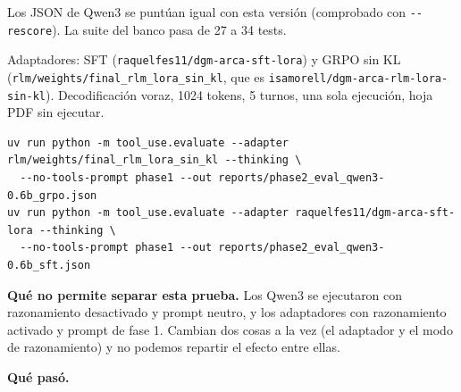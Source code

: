 Los JSON de Qwen3 se puntúan igual con esta versión (comprobado con \texttt{-\/\allowbreak{}-rescore}). La suite del
banco pasa de 27 a 34 tests.

Adaptadores: SFT (\texttt{raquelfes11/\allowbreak{}dgm-arca-sft-lora}) y GRPO sin KL (\texttt{rlm/\allowbreak{}weights/\allowbreak{}final\_\allowbreak{}rlm\_\allowbreak{}lora\_\allowbreak{}sin\_\allowbreak{}kl},
que es \texttt{isamorell/\allowbreak{}dgm-arca-rlm-lora-sin-kl}). Decodificación voraz, 1024 tokens, 5 turnos, una sola
ejecución, hoja PDF sin ejecutar.

\begin{lstlisting}
uv run python -m tool_use.evaluate --adapter rlm/weights/final_rlm_lora_sin_kl --thinking \
  --no-tools-prompt phase1 --out reports/phase2_eval_qwen3-0.6b_grpo.json
uv run python -m tool_use.evaluate --adapter raquelfes11/dgm-arca-sft-lora --thinking \
  --no-tools-prompt phase1 --out reports/phase2_eval_qwen3-0.6b_sft.json
\end{lstlisting}

\textbf{Qué no permite separar esta prueba.} Los Qwen3 se ejecutaron con razonamiento desactivado y prompt
neutro, y los adaptadores con razonamiento activado y prompt de fase 1. Cambian dos cosas a la vez
(el adaptador y el modo de razonamiento) y no podemos repartir el efecto entre ellas.

\textbf{Qué pasó.}

